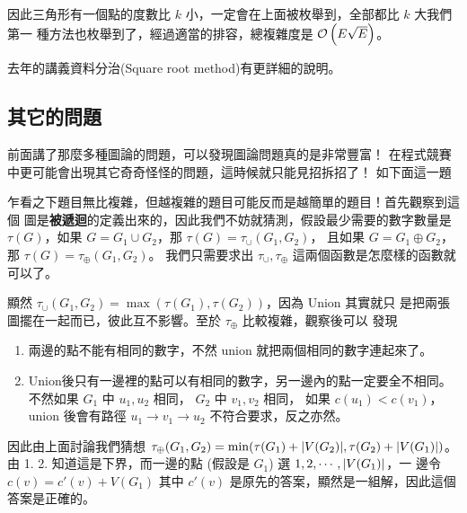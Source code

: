 \documentclass[a4paper,12pt]{book}
\begin{document}
因此三角形有一個點的度數比 $k$ 小，一定會在上面被枚舉到，全部都比 $k$ 大我們第一
種方法也枚舉到了，經過適當的排容，總複雜度是 $\operatorname{\mathcal{O}}\left(E \sqrt{E}\right)$。

去年的講義資料分治(Square root method)有更詳細的說明。

\subsection{其它的問題}
前面講了那麼多種圖論的問題，可以發現圖論問題真的是非常豐富！
在程式競賽中更可能會出現其它奇奇怪怪的問題，這時候就只能見招拆招了！
如下面這一題


乍看之下題目無比複雜，但越複雜的題目可能反而是越簡單的題目！首先觀察到這個
圖是{\bf 被遞迴}的定義出來的，因此我們不妨就猜測，假設最少需要的數字數量是
$\tau(G)$，如果 $G = G_1 \cup G_2$，那 $\tau(G) = \tau_\cup(G_1, G_2)$，
且如果 $G = G_1 \oplus G_2$，那 $\tau(G) = \tau_\oplus(G_1, G_2)$。
我們只需要求出 $\tau_\cup, \tau_\oplus$ 這兩個函數是怎麼樣的函數就可以了。

顯然 $\tau_\cup(G_1, G_2) = \max(\tau(G_1), \tau(G_2))$，因為 Union 其實就只
是把兩張圖擺在一起而已，彼此互不影響。至於 $\tau_\oplus$ 比較複雜，觀察後可以
發現
\begin{enumerate}
  \item  兩邊的點不能有相同的數字，不然 union 就把兩個相同的數字連起來了。
  \item  Union後只有一邊裡的點可以有相同的數字，另一邊內的點一定要全不相同。
          不然如果 $G_1$ 中 $u_1, u_2$ 相同， $G_2$ 中 $v_1, v_2$ 相同，
          如果 $c(u_1) < c(v_1)$，union 後會有路徑
        $u_1 \to v_1 \to u_2$ 不符合要求，反之亦然。
\end{enumerate}
因此由上面討論我們猜想 $\tau_\oplus(G_1, G_2) = \min(\tau(G_1)+\lvert V(G_2) \rvert, 
\tau(G_2)+\lvert V(G_1) \rvert)$。
由 1. 2. 知道這是下界，而一邊的點 (假設是 $G_1$) 選 $1, 2, \cdots, \lvert V(G_1) \rvert$，一
邊令 $c(v) = c'(v) + V(G_1)$ 其中 $c'(v)$ 是原先的答案，顯然是一組解，因此這個答案是正確的。
\end{document}

